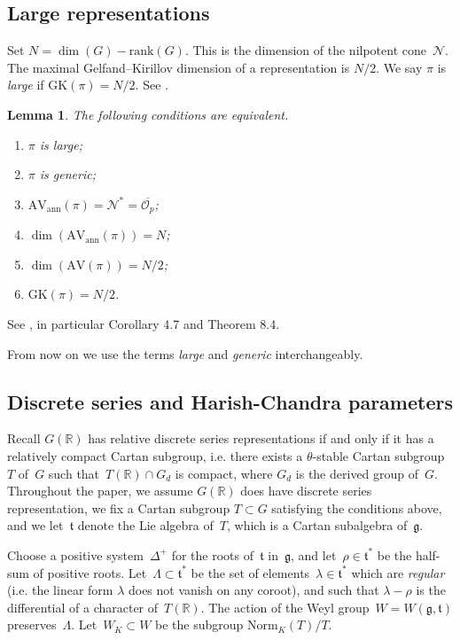 \documentclass[10pt,leqno]{article}
\newtheorem{lemma}[equation]{Lemma}
\numberwithin{equation}{section}
\renewcommand{\O}{\mathcal O}
\newcommand{\R}{\mathbb R}
\newcommand{\N}{\mathcal N}
\renewcommand{\t}{\mathfrak t}
\newcommand{\g}{\mathfrak g}
\newcommand{\AV}{\mathrm{AV}}
\newcommand{\AVann}{\mathrm{AV}_{\mathrm{ann}}}
\newcommand{\GK}{\mathrm{GK}}
\newcommand{\Op}{\O_p}
\begin{document}
\subsection{Large representations} Set $N=\dim(G)-\mathrm{rank}(G)$. This is the dimension of the nilpotent cone~$\N$. The maximal Gelfand--Kirillov dimension of a representation is $N/2$.
We say $\pi$ is {\it large} if $\GK(\pi)=N/2$. See \cite[Section~6]{vogan-gelfand-kirillov}. 


\begin{lemma}
  \label{l:large}
  The following conditions are equivalent.
  \begin{enumerate}
  \item $\pi$ is large\textup{;}
        \item $\pi$ is generic\textup{;}
\item $\AVann(\pi)=\N^*=\overline{\Op}$\textup{;}
\item $\dim(\AVann(\pi))=N$\textup{;}
  \item $\dim(\AV(\pi))=N/2$\textup{;}
  \item $\GK(\pi)=N/2$.
\end{enumerate}
\end{lemma}
See \cite{vogan_bowdoin}, in particular Corollary 4.7 and Theorem 8.4.

From now on we use the terms {\it large} and {\it generic} interchangeably.


\subsection{Discrete series and Harish-Chandra parameters} \label{sec:discrete_series}

Recall $G(\R)$ has relative discrete series representations if and only if it has a relatively compact Cartan subgroup, i.e. there exists a $\theta$-stable Cartan subgroup~$T$ of~$G$  such that~$T(\R) \cap G_d$ is  compact, where $G_d$ is the derived group of~$G$. Throughout the paper, we assume $G(\R)$ does have discrete series representation, we fix  a Cartan subgroup $T \subset G$ satisfying the conditions above, and we let~$\mathfrak{t}$ denote the Lie algebra of~$T$, which is a Cartan subalgebra of~$\g$. 

Choose a  positive system~$\Delta^+$  for the roots of~$\t$ in~$\g$, and let~$\rho \in \mathfrak{t}^\ast$ be the half-sum of positive roots. Let~$\Lambda \subset \mathfrak{t}^\ast$ be the set of elements~$\lambda \in \mathfrak{t}^\ast$ which are \emph{regular} (i.e. the linear form $\lambda$ does not vanish on any coroot), and such that $\lambda-\rho$  is the differential of a character of~$T(\R)$. The action of the Weyl group~$W=W(\g, \t)$ preserves~$\Lambda$. Let~$W_K\subset W$ be the subgroup $\mathrm{Norm}_K(T)/T$. 
\end{document}

